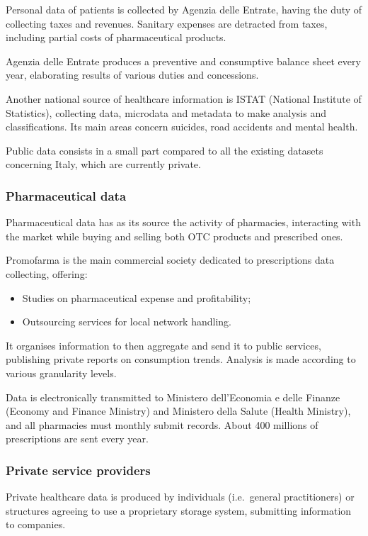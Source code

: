 Personal data of patients is collected by Agenzia delle Entrate, having the duty of collecting taxes and revenues. Sanitary expenses are detracted from taxes, including partial costs of pharmaceutical products. 

Agenzia delle Entrate produces a preventive and consumptive balance sheet every year, elaborating results of various duties and concessions.

Another national source of healthcare information is ISTAT (National Institute of Statistics), collecting data, microdata and metadata to make analysis and classifications. Its main areas concern suicides, road accidents and mental health.

Public data consists in a small part compared to all the existing datasets concerning Italy, which are currently private.

\subsubsection{Pharmaceutical data}
Pharmaceutical data has as its source the activity of pharmacies, interacting with the market while buying and selling both OTC products and prescribed ones.

Promofarma is the main commercial society dedicated to prescriptions data collecting, offering:
\begin{itemize}
	\item Studies on pharmaceutical expense and profitability;
	\item Outsourcing services for local network handling.
\end{itemize}

It organises information to then aggregate and send it to public services, publishing private reports on consumption trends. Analysis is made according to various granularity levels.

Data is electronically transmitted to Ministero dell'Economia e delle Finanze (Economy and Finance Ministry) and Ministero della Salute (Health Ministry), and all pharmacies must monthly submit records\cite{promofarma}. About 400 millions of prescriptions are sent every year.

\subsubsection{Private service providers}
Private healthcare data is produced by individuals (i.e.\ general practitioners) or structures agreeing to use a proprietary storage system, submitting information to companies.


